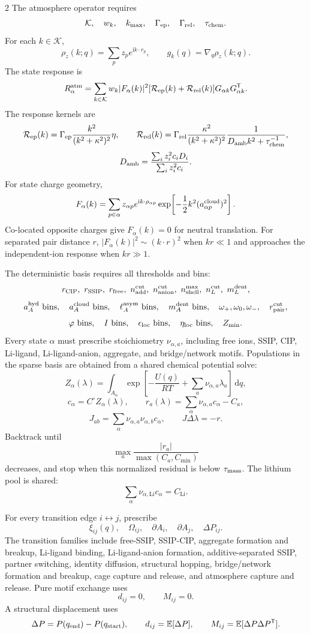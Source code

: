 \documentclass[10pt]{article}
\newcommand{\dd}{\,\mathrm d}
\newcommand{\T}{\mathsf{T}}
\begin{document}
\begin{multicols}{2}
The atmosphere operator requires
\[
\mathcal K,\quad w_k,\quad k_{\max},\quad
\Gamma_{\rm ep},\quad \Gamma_{\rm rel},\quad \tau_{\rm chem}.
\]
For each \(k\in\mathcal K\),
\[
\rho_z(k;q)=\sum_pz_pe^{\mathrm i k\cdot r_p},
\qquad
g_k(q)=\nabla_q\rho_z(k;q).
\]
The state response is
\[
R_\alpha^{\rm atm}
=
\sum_{k\in\mathcal K}
w_k|F_\alpha(k)|^2
[\mathcal R_{\rm ep}(k)+\mathcal R_{\rm rel}(k)]
G_{\alpha k}G_{\alpha k}^\T.
\]
The response kernels are
\[
\mathcal R_{\rm ep}(k)
=
\Gamma_{\rm ep}\frac{k^2}{(k^2+\kappa^2)^2}\eta,
\qquad
\mathcal R_{\rm rel}(k)
=
\Gamma_{\rm rel}
\frac{\kappa^2}{(k^2+\kappa^2)^2}
\frac{1}{D_{\rm amb}k^2+\tau_{\rm chem}^{-1}},
\]
\[
D_{\rm amb}
=
\frac{\sum_i z_i^2c_iD_i}{\sum_i z_i^2c_i}.
\]
For state charge geometry,
\[
F_\alpha(k)
=
\sum_{p\in\alpha}
z_{\alpha p}
e^{\mathrm i k\cdot\rho_{\alpha p}}
\exp\!\left[-\frac12k^2(a_{\alpha p}^{\rm cloud})^2\right].
\]
Co-located opposite charges give \(F_\alpha(k)=0\) for neutral translation.
For separated pair distance \(r\), \(|F_\alpha(k)|^2\sim(k\cdot r)^2\) when
\(kr\ll1\) and approaches the independent-ion response when \(kr\gg1\).

The deterministic basis requires all thresholds and bins:
\[
r_{\rm CIP},\ r_{\rm SSIP},\ r_{\rm free},\
n_{\rm add}^{\rm cut},\ n_{\rm anion}^{\rm cut},\
n_{\rm shell}^{\max},\
n_L^{\rm cut},\ m_L^{\rm dent},
\]
\[
a_A^{\rm hyd}\ {\rm bins},\quad
a_A^{\rm cloud}\ {\rm bins},\quad
\ell_A^{\rm asym}\ {\rm bins},\quad
m_A^{\rm dent}\ {\rm bins},\quad
\omega_+,\omega_0,\omega_-,\quad
r_{\rm pair}^{\rm cut},
\]
\[
\varphi\ {\rm bins},\quad
I\ {\rm bins},\quad
\epsilon_{\rm loc}\ {\rm bins},\quad
\eta_{\rm loc}\ {\rm bins},\quad
Z_{\min}.
\]
Every state \(\alpha\) must prescribe stoichiometry \(\nu_{\alpha,a}\), including
free ions, SSIP, CIP, Li-ligand, Li-ligand-anion, aggregate, and bridge/network
motifs. Populations in the sparse basis are obtained from a shared chemical
potential solve:
\[
Z_\alpha(\lambda)
=
\int_{A_\alpha}
\exp\left[
-\frac{U(q)}{RT}
+\sum_a\nu_{\alpha,a}\lambda_a
\right]\dd q,
\]
\[
c_\alpha=C^\circ Z_\alpha(\lambda),
\qquad
r_a(\lambda)=\sum_\alpha\nu_{\alpha,a}c_\alpha-C_a,
\]
\[
J_{ab}=\sum_\alpha\nu_{\alpha,a}\nu_{\alpha,b}c_\alpha,
\qquad
J\Delta\lambda=-r.
\]
Backtrack until
\[
\max_a\frac{|r_a|}{\max(C_a,C_{\min})}
\]
decreases, and stop when this normalized residual is below
\(\tau_{\rm mass}\). The lithium pool is shared:
\[
\sum_\alpha\nu_{\alpha,\mathrm{Li}}c_\alpha=C_{\mathrm{Li}}.
\]

For every transition edge \(i\leftrightarrow j\), prescribe
\[
\xi_{ij}(q),\quad \Omega_{ij},\quad
\partial A_i,\quad \partial A_j,\quad
\Delta P_{ij}.
\]
The transition families include free-SSIP, SSIP-CIP, aggregate formation and
breakup, Li-ligand binding, Li-ligand-anion formation, additive-separated SSIP,
partner switching, identity diffusion, structural hopping, bridge/network
formation and breakup, cage capture and release, and atmosphere capture and
release. Pure motif exchange uses
\[
d_{ij}=0,\qquad M_{ij}=0.
\]
A structural displacement uses
\[
\Delta P=P(q_{\rm end})-P(q_{\rm start}),
\qquad
d_{ij}=\mathbb E[\Delta P],
\qquad
M_{ij}=\mathbb E[\Delta P\Delta P^\T].
\]


\end{multicols}
\end{document}
